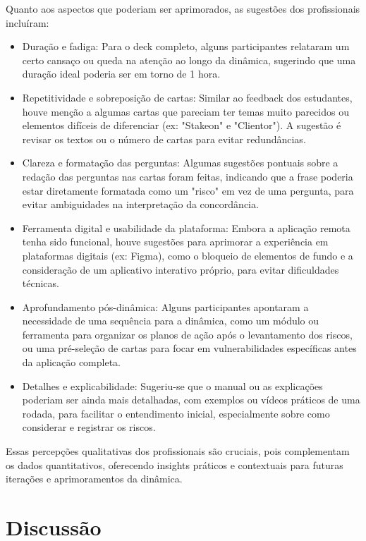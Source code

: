 \documentclass[
	12pt,
	openright,
	twoside,
	a4paper,
	english,
	brazil
	]{abntex2}
\begin{document}
Quanto aos aspectos que poderiam ser aprimorados, as sugestões dos profissionais incluíram:
\begin{itemize}
  \item Duração e fadiga: Para o deck completo, alguns participantes relataram um certo cansaço ou queda na atenção ao longo da dinâmica, sugerindo que uma duração ideal poderia ser em torno de 1 hora.
  \item Repetitividade e sobreposição de cartas: Similar ao feedback dos estudantes, houve menção a algumas cartas que pareciam ter temas muito parecidos ou elementos difíceis de diferenciar (ex: "Stakeon" e "Clientor"). A sugestão é revisar os textos ou o número de cartas para evitar redundâncias.
  \item Clareza e formatação das perguntas: Algumas sugestões pontuais sobre a redação das perguntas nas cartas foram feitas, indicando que a frase poderia estar diretamente formatada como um "risco" em vez de uma pergunta, para evitar ambiguidades na interpretação da concordância.
  \item Ferramenta digital e usabilidade da plataforma: Embora a aplicação remota tenha sido funcional, houve sugestões para aprimorar a experiência em plataformas digitais (ex: Figma), como o bloqueio de elementos de fundo e a consideração de um aplicativo interativo próprio, para evitar dificuldades técnicas.
  \item Aprofundamento pós-dinâmica: Alguns participantes apontaram a necessidade de uma sequência para a dinâmica, como um módulo ou ferramenta para organizar os planos de ação após o levantamento dos riscos, ou uma pré-seleção de cartas para focar em vulnerabilidades específicas antes da aplicação completa.
  \item Detalhes e explicabilidade: Sugeriu-se que o manual ou as explicações poderiam ser ainda mais detalhadas, com exemplos ou vídeos práticos de uma rodada, para facilitar o entendimento inicial, especialmente sobre como considerar e registrar os riscos.
\end{itemize}

Essas percepções qualitativas dos profissionais são cruciais, pois complementam os dados quantitativos, oferecendo insights práticos e contextuais para futuras iterações e aprimoramentos da dinâmica.

\section{Discussão}
\label{sec:discussao}
\end{document}
